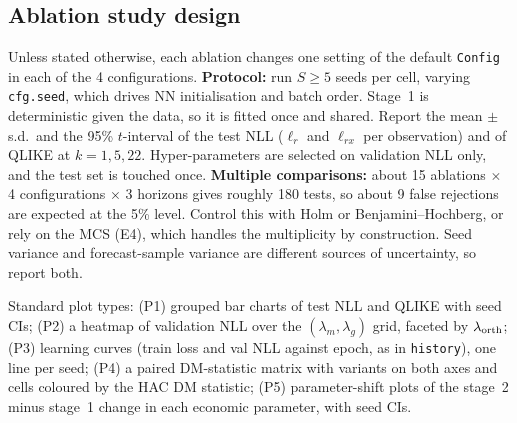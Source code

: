 \documentclass[11pt]{article}
\begin{document}
\subsection{Ablation study design}\label{sec:figs-abl}
Unless stated otherwise, each ablation changes one setting of the default \texttt{Config} in each of the 4 configurations.
\textbf{Protocol:} run $S\ge5$ seeds per cell, varying \texttt{cfg.seed}, which drives NN initialisation and
batch order. Stage~1 is deterministic given the data, so it is fitted once and shared. Report the mean $\pm$ s.d.\
and the 95\% $t$-interval of the test NLL ($\ell_r$ and $\ell_{rx}$ per observation) and of QLIKE at $k=1,5,22$.
Hyper-parameters are selected on validation NLL only, and the test set is touched once.
\textbf{Multiple comparisons:} about 15 ablations $\times$ 4 configurations $\times$ 3 horizons gives
roughly 180 tests, so about 9 false rejections are expected at the 5\% level. Control this with Holm or
Benjamini--Hochberg, or rely on the MCS (E4), which handles the multiplicity by construction. Seed variance and
forecast-sample variance are different sources of uncertainty, so report both.

Standard plot types:
(P1) grouped bar charts of test NLL and QLIKE with seed CIs;
(P2) a heatmap of validation NLL over the $(\lambda_m,\lambda_g)$ grid, faceted by $\lambda_{\rm orth}$;
(P3) learning curves (train loss and val NLL against epoch, as in \texttt{history}), one line per seed;
(P4) a paired DM-statistic matrix with variants on both axes and cells coloured by the HAC DM statistic;
(P5) parameter-shift plots of the stage~2 minus stage~1 change in each economic parameter, with seed CIs.
\end{document}

